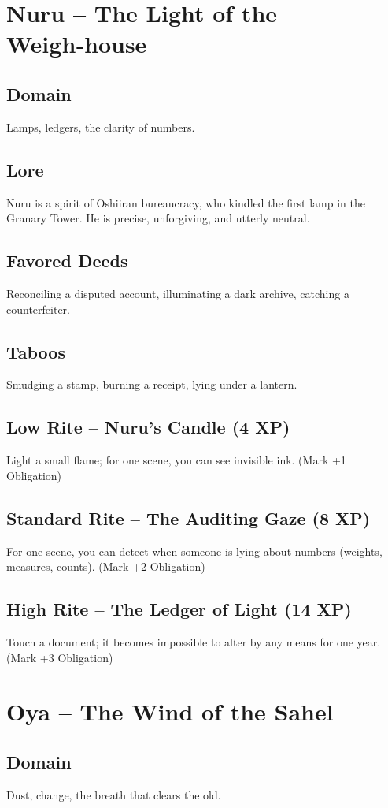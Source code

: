 \documentclass[11pt]{book}
\begin{document}
\section{Nuru -- The Light of the Weigh‑house}
\subsection*{Domain}
Lamps, ledgers, the clarity of numbers.
\subsection*{Lore}
Nuru is a spirit of Oshiiran bureaucracy, who kindled the first lamp in the Granary Tower. He is precise, unforgiving, and utterly neutral.
\subsection*{Favored Deeds}
Reconciling a disputed account, illuminating a dark archive, catching a counterfeiter.
\subsection*{Taboos}
Smudging a stamp, burning a receipt, lying under a lantern.
\subsection*{Low Rite -- Nuru's Candle (4 XP)}
Light a small flame; for one scene, you can see invisible ink. (Mark +1 Obligation)
\subsection*{Standard Rite -- The Auditing Gaze (8 XP)}
For one scene, you can detect when someone is lying about numbers (weights, measures, counts). (Mark +2 Obligation)
\subsection*{High Rite -- The Ledger of Light (14 XP)}
Touch a document; it becomes impossible to alter by any means for one year. (Mark +3 Obligation)

\section{Oya -- The Wind of the Sahel}
\subsection*{Domain}
Dust, change, the breath that clears the old.
\end{document}
